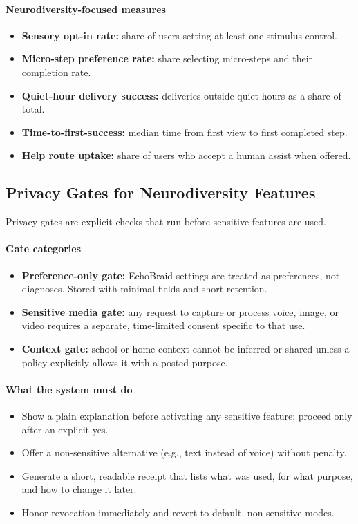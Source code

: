 \documentclass[12pt]{article}
\begin{document}
\paragraph{Neurodiversity-focused measures}
\begin{itemize}[leftmargin=*]
  \item \textbf{Sensory opt-in rate:} share of users setting at least one stimulus control.
  \item \textbf{Micro-step preference rate:} share selecting micro-steps and their completion rate.
  \item \textbf{Quiet-hour delivery success:} deliveries outside quiet hours as a share of total.
  \item \textbf{Time-to-first-success:} median time from first view to first completed step.
  \item \textbf{Help route uptake:} share of users who accept a human assist when offered.
\end{itemize}

\subsection*{Privacy Gates for Neurodiversity Features}
Privacy gates are explicit checks that run before sensitive features are used.

\paragraph{Gate categories}
\begin{itemize}[leftmargin=*]
  \item \textbf{Preference-only gate:} EchoBraid settings are treated as preferences, not diagnoses. Stored with minimal fields and short retention.
  \item \textbf{Sensitive media gate:} any request to capture or process voice, image, or video requires a separate, time-limited consent specific to that use.
  \item \textbf{Context gate:} school or home context cannot be inferred or shared unless a policy explicitly allows it with a posted purpose.
\end{itemize}

\paragraph{What the system must do}
\begin{itemize}[leftmargin=*]
  \item Show a plain explanation before activating any sensitive feature; proceed only after an explicit yes.
  \item Offer a non-sensitive alternative (e.g., text instead of voice) without penalty.
  \item Generate a short, readable receipt that lists what was used, for what purpose, and how to change it later.
  \item Honor revocation immediately and revert to default, non-sensitive modes.
\end{itemize}
\end{document}
